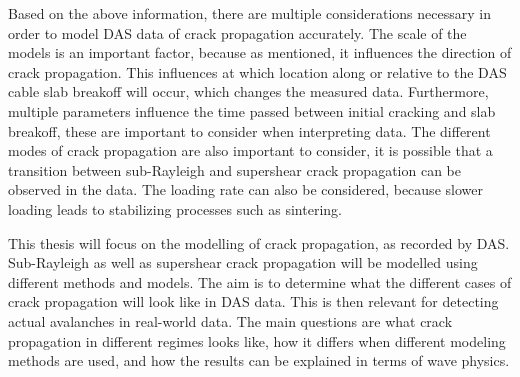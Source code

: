   
  Based on the above information, there are multiple considerations necessary in order to model DAS data of crack propagation accurately. The scale of the models is an important factor, because as mentioned, it influences the direction of crack propagation. This influences at which location along or relative to the DAS cable slab breakoff will occur, which changes the measured data. Furthermore, multiple parameters influence the time passed between initial cracking and slab breakoff, these are important to consider when interpreting data. The different modes of crack propagation are also important to consider, it is possible that a transition between sub-Rayleigh and supershear crack propagation can be observed in the data. The loading rate can also be considered, because slower loading leads to stabilizing processes such as sintering. \par

  This thesis will focus on the modelling of crack propagation, as recorded by DAS. Sub-Rayleigh as well as supershear crack propagation will be modelled using different methods and models. The aim is to determine what the different cases of crack propagation will look like in DAS data. This is then relevant for detecting actual avalanches in real-world data. The main questions are what crack propagation in different regimes looks like, how it differs when different modeling methods are used, and how the results can be explained in terms of wave physics. \par


